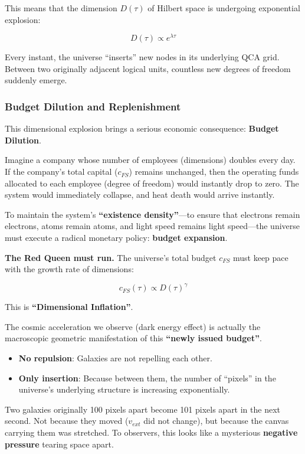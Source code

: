 This means that the dimension $D(\tau)$ of Hilbert space is undergoing exponential explosion:

\[D(\tau) \propto e^{\lambda \tau}\]

Every instant, the universe ``inserts'' new nodes in its underlying QCA grid. Between two originally adjacent logical units, countless new degrees of freedom suddenly emerge.

\subsubsection{Budget Dilution and Replenishment}

This dimensional explosion brings a serious economic consequence: \textbf{Budget Dilution}.

Imagine a company whose number of employees (dimensions) doubles every day. If the company's total capital ($c_{FS}$) remains unchanged, then the operating funds allocated to each employee (degree of freedom) would instantly drop to zero. The system would immediately collapse, and heat death would arrive instantly.

To maintain the system's \textbf{``existence density''}---to ensure that electrons remain electrons, atoms remain atoms, and light speed remains light speed---the universe must execute a radical monetary policy: \textbf{budget expansion}.

\textbf{The Red Queen must run.} The universe's total budget $c_{FS}$ must keep pace with the growth rate of dimensions:

\[c_{FS}(\tau) \propto D(\tau)^{\gamma}\]

This is \textbf{``Dimensional Inflation''}.

The cosmic acceleration we observe (dark energy effect) is actually the macroscopic geometric manifestation of this \textbf{``newly issued budget''}.

\begin{itemize}
\item \textbf{No repulsion}: Galaxies are not repelling each other.

\item \textbf{Only insertion}: Because between them, the number of ``pixels'' in the universe's underlying structure is increasing exponentially.
\end{itemize}

Two galaxies originally 100 pixels apart become 101 pixels apart in the next second. Not because they moved ($v_{ext}$ did not change), but because the canvas carrying them was stretched. To observers, this looks like a mysterious \textbf{negative pressure} tearing space apart.

